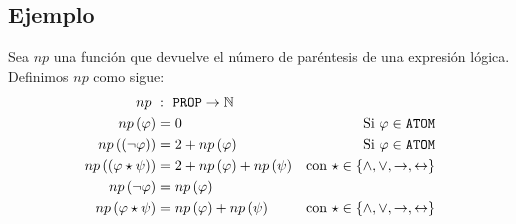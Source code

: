 \documentclass[a4paper]{article}
\begin{document}
\subsection{Ejemplo}
\noindent
Sea \(np\) una función que devuelve el número de paréntesis de una expresión lógica.
\newline 
Definimos \(np\) como sigue:
\begin{align*}
    np \ &: \ \text{\texttt{PROP}} \to \mathbb{N} &  \\ 
    np\left(\varphi\right) &= 0 & \text{Si \(\varphi \in \text{\texttt{ATOM}}\)} \\ 
    np\left(\left(\neg \varphi \right)\right) &= 2 + np\left(\varphi\right) & \text{Si \(\varphi \in \text{\texttt{ATOM}}\)} \\ 
    np\left(\left(\varphi \star \psi \right)\right) &= 2 + np\left(\varphi\right) + np\left(\psi\right) & \text{con \(\star \in \left\{\land, \lor, \rightarrow, \leftrightarrow\right\}\)} \\ 
    np\left(\neg \varphi\right) &= np\left(\varphi\right) \\
    np\left(\varphi \star \psi \right) &= np\left(\varphi\right) + np\left(\psi\right) & \text{con \(\star \in \left\{\land, \lor, \rightarrow, \leftrightarrow\right\}\)}
\end{align*}
\end{document}

